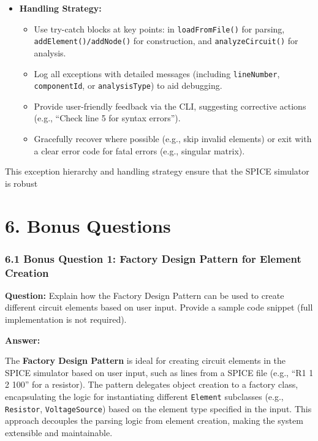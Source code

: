 \documentclass{article}
\begin{document}
\begin{itemize}
    \item \textbf{Handling Strategy:}
    \begin{itemize}
        \item Use try-catch blocks at key points: in \texttt{loadFromFile()} for parsing, \texttt{addElement()/addNode()} for construction, and \texttt{analyzeCircuit()} for analysis.
        \item Log all exceptions with detailed messages (including \texttt{lineNumber}, \texttt{componentId}, or \texttt{analysisType}) to aid debugging.
        \item Provide user-friendly feedback via the CLI, suggesting corrective actions (e.g., “Check line 5 for syntax errors”).
        \item Gracefully recover where possible (e.g., skip invalid elements) or exit with a clear error code for fatal errors (e.g., singular matrix).
    \end{itemize}
\end{itemize}

This exception hierarchy and handling strategy ensure that the SPICE simulator is robust










\section*{6. Bonus Questions}

\subsubsection*{6.1 Bonus Question 1: Factory Design Pattern for Element Creation}

\textbf{Question:} Explain how the Factory Design Pattern can be used to create different circuit elements based on user input. Provide a sample code snippet (full implementation is not required).

\textbf{Answer:}

The \textbf{Factory Design Pattern} is ideal for creating circuit elements in the SPICE simulator based on user input, such as lines from a SPICE file (e.g., “R1 1 2 100” for a resistor). The pattern delegates object creation to a factory class, encapsulating the logic for instantiating different \texttt{Element} subclasses (e.g., \texttt{Resistor}, \texttt{VoltageSource}) based on the element type specified in the input. This approach decouples the parsing logic from element creation, making the system extensible and maintainable.
\end{document}
